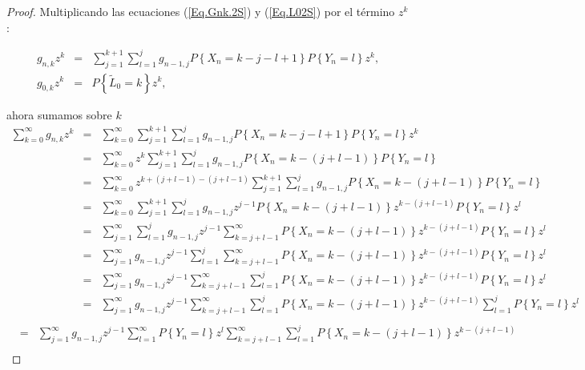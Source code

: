 \begin{proof}

Multiplicando las ecuaciones (\ref{Eq.Gnk.2S}) y (\ref{Eq.L02S})
por el t\'ermino $z^{k}$:

\begin{eqnarray*}
g_{n,k}z^{k}&=&\sum_{j=1}^{k+1}\sum_{l=1}^{j}g_{n-1,j}P\left\{X_{n}=k-j-l+1\right\}P\left\{Y_{n}=l\right\}z^{k},\\
g_{0,k}z^{k}&=&P\left\{\tilde{L}_{0}=k\right\}z^{k},
\end{eqnarray*}

ahora sumamos sobre $k$
\begin{eqnarray*}
\sum_{k=0}^{\infty}g_{n,k}z^{k}&=&\sum_{k=0}^{\infty}\sum_{j=1}^{k+1}\sum_{l=1}^{j}g_{n-1,j}P\left\{X_{n}=k-j-l+1\right\}P\left\{Y_{n}=l\right\}z^{k}\\
&=&\sum_{k=0}^{\infty}z^{k}\sum_{j=1}^{k+1}\sum_{l=1}^{j}g_{n-1,j}P\left\{X_{n}=k-\left(j+l
-1\right)\right\}P\left\{Y_{n}=l\right\}\\
&=&\sum_{k=0}^{\infty}z^{k+\left(j+l-1\right)-\left(j+l-1\right)}\sum_{j=1}^{k+1}\sum_{l=1}^{j}g_{n-1,j}P\left\{X_{n}=k-
\left(j+l-1\right)\right\}P\left\{Y_{n}=l\right\}\\
&=&\sum_{k=0}^{\infty}\sum_{j=1}^{k+1}\sum_{l=1}^{j}g_{n-1,j}z^{j-1}P\left\{X_{n}=k-
\left(j+l-1\right)\right\}z^{k-\left(j+l-1\right)}P\left\{Y_{n}=l\right\}z^{l}\\
&=&\sum_{j=1}^{\infty}\sum_{l=1}^{j}g_{n-1,j}z^{j-1}\sum_{k=j+l-1}^{\infty}P\left\{X_{n}=k-
\left(j+l-1\right)\right\}z^{k-\left(j+l-1\right)}P\left\{Y_{n}=l\right\}z^{l}\\
&=&\sum_{j=1}^{\infty}g_{n-1,j}z^{j-1}\sum_{l=1}^{j}\sum_{k=j+l-1}^{\infty}P\left\{X_{n}=k-
\left(j+l-1\right)\right\}z^{k-\left(j+l-1\right)}P\left\{Y_{n}=l\right\}z^{l}\\
&=&\sum_{j=1}^{\infty}g_{n-1,j}z^{j-1}\sum_{k=j+l-1}^{\infty}\sum_{l=1}^{j}P\left\{X_{n}=k-
\left(j+l-1\right)\right\}z^{k-\left(j+l-1\right)}P\left\{Y_{n}=l\right\}z^{l}\\
&=&\sum_{j=1}^{\infty}g_{n-1,j}z^{j-1}\sum_{k=j+l-1}^{\infty}\sum_{l=1}^{j}P\left\{X_{n}=k-
\left(j+l-1\right)\right\}z^{k-\left(j+l-1\right)}\sum_{l=1}^{j}P
\left\{Y_{n}=l\right\}z^{l}\\
\end{eqnarray*}
\begin{eqnarray*}
&=&\sum_{j=1}^{\infty}g_{n-1,j}z^{j-1}\sum_{l=1}^{\infty}P\left\{Y_{n}=l\right\}z^{l}
\sum_{k=j+l-1}^{\infty}\sum_{l=1}^{j}
P\left\{X_{n}=k-\left(j+l-1\right)\right\}z^{k-\left(j+l-1\right)}\\

\end{eqnarray*}
\end{proof}
